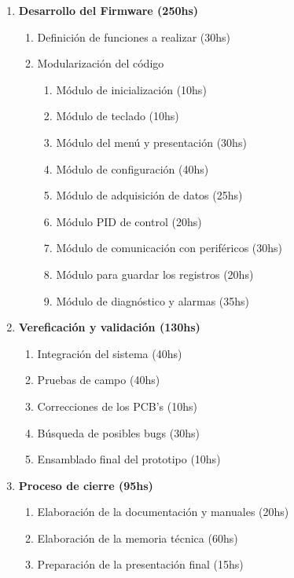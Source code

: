 \documentclass[11pt]{charter}
\begin{document}
\begin{enumerate}
	\item \textbf{Desarrollo del Firmware (250hs)}
	\begin{enumerate}[label*=\arabic*.]
		\item Definición de funciones a realizar (30hs)
		\item Modularización del código
			\begin{enumerate}[label*=\arabic*.]
				\item Módulo de inicialización (10hs)
				\item Módulo de teclado (10hs)
				\item Módulo del menú y presentación (30hs)
				\item Módulo de configuración (40hs)
				\item Módulo de adquisición de datos (25hs)
				\item Módulo PID de control (20hs)	
				\item Módulo de comunicación con periféricos (30hs)
				\item Módulo para guardar los registros  (20hs)
				\item Módulo de diagnóstico y alarmas (35hs)   
			\end{enumerate}	  
	\end{enumerate}
	
	\item \textbf{Vereficación y validación (130hs)}
	\begin{enumerate}[label*=\arabic*.]
		\item Integración del sistema (40hs)
		\item Pruebas de campo (40hs)
		\item Correcciones de los PCB's (10hs)	
		\item Búsqueda de posibles bugs  (30hs)
		\item Ensamblado final del prototipo (10hs)  
	\end{enumerate}	
	
	\item \textbf{Proceso de cierre (95hs)}
	\begin{enumerate}[label*=\arabic*.]
		\item Elaboración de la documentación y manuales (20hs)
		\item Elaboración de la memoria técnica (60hs)
		\item Preparación de la presentación final (15hs)	 
	\end{enumerate}		
\end{enumerate}
\end{document}

